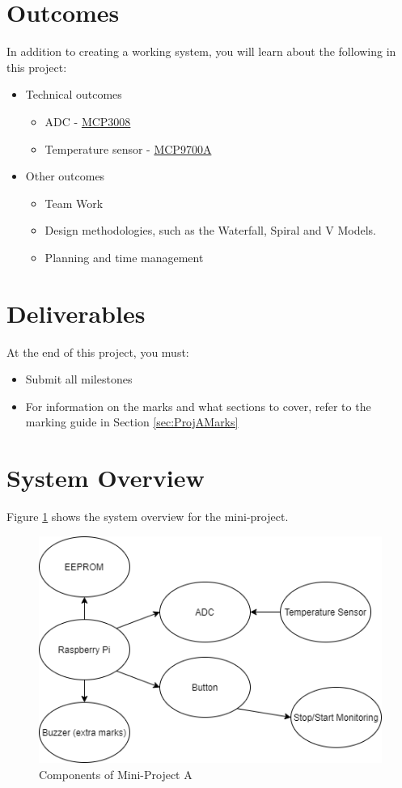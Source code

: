 \section{Outcomes}
In addition to creating a working system, you will learn about the following in this project:
\begin{itemize}
    \item Technical outcomes
    \begin{itemize}
        \item ADC - \href{https://cdn-shop.adafruit.com/datasheets/MCP3008.pdf}{MCP3008}
        \item Temperature sensor - \href{http://ww1.microchip.com/downloads/en/devicedoc/20001942g.pdf}{MCP9700A}
        
    \end{itemize}
    \item Other outcomes
    \begin{itemize}
        \item Team Work
        \item Design methodologies, such as the Waterfall, Spiral and V Models.
        \item Planning and time management
    \end{itemize}
    
    
\end{itemize}

\section{Deliverables}
At the end of this project, you must:
\begin{itemize}
    \item Submit all milestones
    \item For information on the marks and what sections to cover, refer to the marking guide in Section \ref{sec:ProjAMarks}
\end{itemize}

\section{System Overview}
Figure \ref{fig:SystemOverview} shows the system overview for the mini-project.
\begin{figure}[H]
\centering
\includegraphics[width=0.6\columnwidth]{Figures/2020-SystemOverview-A}
\caption{Components of Mini-Project A}
\label{fig:SystemOverview}
\end{figure}

